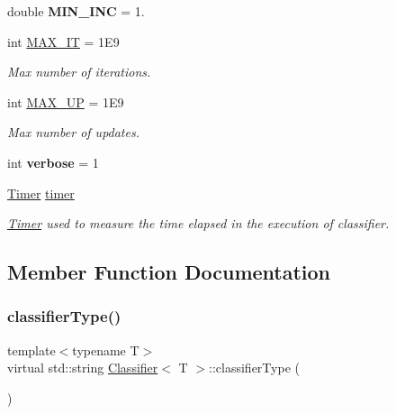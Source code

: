 \begin{DoxyCompactItemize}
double {\bfseries M\+I\+N\+\_\+\+I\+NC} = 1.
\item 
\mbox{\label{class_classifier_a3b7f1c31910fff58907bcfe2cfc6cf89}} 
int \hyperlink{class_classifier_a3b7f1c31910fff58907bcfe2cfc6cf89}{M\+A\+X\+\_\+\+IT} = 1\+E9
\begin{DoxyCompactList}\small\item\em Max number of iterations. \end{DoxyCompactList}\item 
\mbox{\label{class_classifier_a8d3289755d689efa65ca009d4c4ffa13}} 
int \hyperlink{class_classifier_a8d3289755d689efa65ca009d4c4ffa13}{M\+A\+X\+\_\+\+UP} = 1\+E9
\begin{DoxyCompactList}\small\item\em Max number of updates. \end{DoxyCompactList}\item 
\mbox{\label{class_classifier_ab76f30bc5403b4e7091cf810d3c96654}} 
int {\bfseries verbose} = 1
\item 
\mbox{\label{class_classifier_a7426be6798e9a184e6d968f91a361a93}} 
\hyperlink{class_timer}{Timer} \hyperlink{class_classifier_a7426be6798e9a184e6d968f91a361a93}{timer}
\begin{DoxyCompactList}\small\item\em \hyperlink{class_timer}{Timer} used to measure the time elapsed in the execution of classifier. \end{DoxyCompactList}\end{DoxyCompactItemize}


\subsection{Member Function Documentation}
\mbox{\label{class_classifier_ab40f42f957ec50939bd9a6b0cd5d1786}} 
\subsubsection{\texorpdfstring{classifier\+Type()}{classifierType()}}
{\footnotesize\ttfamily template$<$typename T$>$ \\
virtual std\+::string \hyperlink{class_classifier}{Classifier}$<$ T $>$\+::classifier\+Type (\begin{DoxyParamCaption}{ }\end{DoxyParamCaption})\hspace{0.3cm}{\ttfamily [pure virtual]}}



